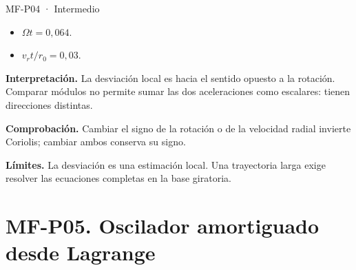\begin{studiumworked}{MF-P04 · Intermedio}
\begin{itemize}
\item $\Omega t=0{,}064$.

\item $v_rt/r_0=0{,}03$.

\end{itemize}

\textbf{Interpretación.} La desviación local es hacia el sentido opuesto a la rotación. Comparar módulos no permite sumar las dos aceleraciones como escalares: tienen direcciones distintas.

\textbf{Comprobación.} Cambiar el signo de la rotación o de la velocidad radial invierte Coriolis; cambiar ambos conserva su signo.

\textbf{Límites.} La desviación es una estimación local. Una trayectoria larga exige resolver las ecuaciones completas en la base giratoria.

\end{studiumworked}



\Needspace{.30\textheight}\section{MF-P05. Oscilador amortiguado desde Lagrange}

